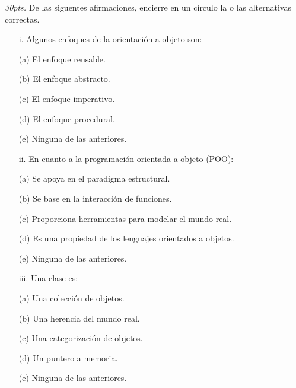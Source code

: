 \documentclass[10pt]{article}
\begin{document}
\begin{enumerate}
    {\scriptsize
    
    \item \emph{30pts.} De las siguentes afirmaciones, encierre en un c\'irculo la o las alternativas correctas.

    \begin{multicols}{2}

    \begin{enumerate}[label=(\alph*)]
        \item[i.] Algunos enfoques de la orientaci\'on a objeto son:
        \item[(a)] El enfoque reusable.
        \item[(b)] El enfoque abstracto.
        \item[(c)] El enfoque imperativo.
        \item[(d)] El enfoque procedural.
        \item[(e)] Ninguna de las anteriores.
    \end{enumerate}

    \begin{enumerate}[label=(\alph*)]
        \item[ii.] En cuanto a la programaci\'on orientada a objeto (POO):
        \item[(a)] Se apoya en el paradigma estructural.
        \item[(b)] Se base en la interacci\'on de funciones.
        \item[(c)] Proporciona herramientas para modelar el mundo real.
        \item[(d)] Es una propiedad de los lenguajes orientados a objetos.
        \item[(e)] Ninguna de las anteriores.
    \end{enumerate}

    \begin{enumerate}[label=(\alph*)]
        \item[iii.] Una clase es: 
        \item[(a)] Una colecci\'on de objetos.
        \item[(b)] Una herencia del mundo real.
        \item[(c)] Una categorizaci\'on de objetos.
        \item[(d)] Un puntero a memoria.
        \item[(e)] Ninguna de las anteriores.
    \end{enumerate}


\end{multicols}}
\end{enumerate}
\end{document}
